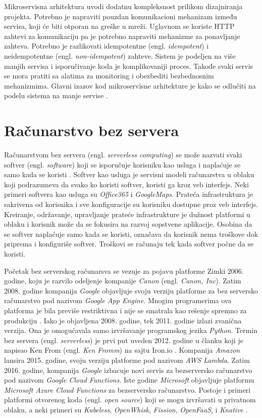 \documentclass[12pt,oneside]{memoir}
\begin{document}
Mikroservisna arhitektura uvodi dodatnu kompleksnost prilikom dizajniranja projekta. Potrebno je napraviti pouzdan komunikacioni mehanizam između servisa, koji će biti otporan na greške u mreži. Uglavnom se koriste HTTP zahtevi za komunikaciju pa je potrebno napraviti mehanizme za ponavljanje zahteva. Potrebno je razlikovati idempotentne (engl. \emph{idempotent}) i neidempotentne (engl. \emph{non-idempotent}) zahteve. Sistem je podeljen na više manjih servisa i isporučivanje koda je komplikovaniji proces. Takođe svaki servis se mora pratiti sa alatima za monitoring i obezbediti bezbednosnim mehanizmima. Glavni izazov kod mikroservisne arhitekture je kako se odlučiti na podelu sistema na manje servise \cite{bm}.


\chapter{Računarstvo bez servera}
\label{chp:razrada}

Računarstvom bez servera (engl. \emph{serverless computing}) se može nazvati svaki softver (engl. \emph{software}) koji se isporučuje korisniku kao usluga i naplaćuje se samo kada se koristi \cite{sa}. Softver kao usluga je servisni modeli računarstva u oblaku koji podrazumeva da svako ko koristi softver, koristi ga kroz veb interfejs. Neki primeri softvera kao usluga su \emph{Office365} i \emph{GoogleMaps}. Prateća infrastruktura je sakrivena od korisnika i sve konfiguracije su korisniku dostupne proz veb interfejs. Kreiranje, održavanje, upravljanje prateće infrastrukture je dužnost platformi u oblaku i korisnik može da se fokusira na razvoj sopstvene aplikacije. Osobina da se softver naplaćuje samo kada se koristi, označava da korisnik nema troškove dok priprema i konfiguriše softver. Troškovi se računaju tek kada softver počne da se koristi.

Početak bez serverskog računarsva se vezuje za pojavu platforme Zimki 2006. godine, koju je razvilo odeljenje kompanije \emph{Canon} (engl. \emph{Canon, Inc}). Zatim 2008. godine kompanija \emph{Google} objavljuje svoju verziju platforme za bez serversko računarstvo pod nazivom \emph{Google App Engine}. Mnogim programerima ova platforma je bila previše restriktivna i nije se smatrala kao rešenje spremno za produkciju \cite{ls}. Iako je objavljena 2008. godine, tek 2011. godine izlazi zvanična verzija. Ona je omogućavala samo izvršavanje programskog jezika \emph{Python}. Termin bez servera (engl. \emph{serverless}) je prvi put uveden 2012. godine u članku koji je napisao Ken From (engl. \emph{Ken Fromm}) na sajtu Iron.io \cite{wtfosaais}. Kompanija \emph{Amazon} lansira 2015. godine, svoju verziju platforme pod nazivom \emph{AWS Lambda}. Zatim 2016. godine, kompanija \emph{Google} izbacuje novi servis za bezserversko računarstvo pod nazivom \emph{Google Cloud Functions}. Iste godine \emph{Microsoft} objavljuje platformu \emph{Microsoft Azure Cloud Functions} za bezserversko računarstvo. Postoje i primeri platformi otvorenog koda (engl. \emph{open source}) koji se mogu izvršavati u privatnom oblaku, a neki primeri su \emph{Kubeless}, \emph{OpenWhisk}, \emph{Fission}, \emph{OpenFaaS}, i \emph{Knative} \cite{ws}.
\end{document}
